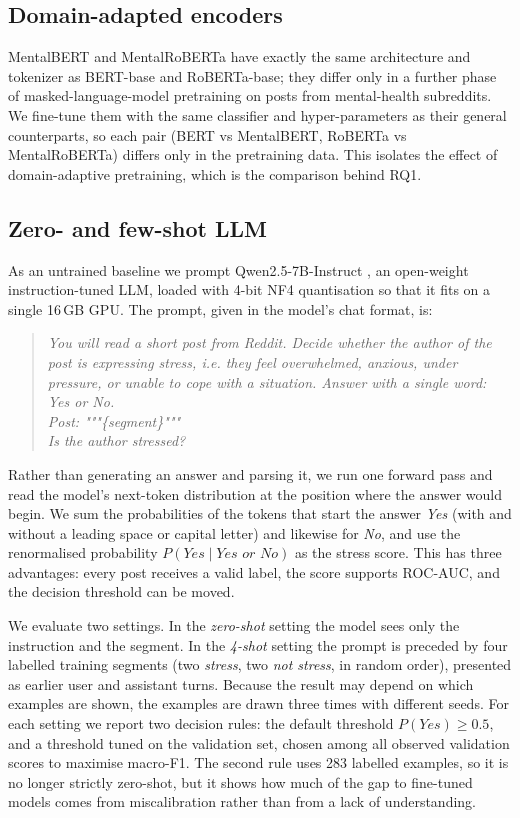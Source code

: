\subsection{Domain-adapted encoders}
MentalBERT and MentalRoBERTa \cite{ji2022mentalbert} have exactly the same architecture and tokenizer
as BERT-base and RoBERTa-base; they differ only in a further phase of masked-language-model
pretraining on posts from mental-health subreddits. We fine-tune them with the same classifier and
hyper-parameters as their general counterparts, so each pair (BERT vs MentalBERT, RoBERTa vs
MentalRoBERTa) differs only in the pretraining data. This isolates the effect of domain-adaptive
pretraining, which is the comparison behind RQ1.

\subsection{Zero- and few-shot LLM}
As an untrained baseline we prompt Qwen2.5-7B-Instruct \cite{qwen2024qwen25}, an open-weight
instruction-tuned LLM, loaded with 4-bit NF4 quantisation \cite{dettmers2023qlora} so that it fits on
a single 16\,GB GPU. The prompt, given in the model's chat format, is:

\begin{quote}\small
\textit{You will read a short post from Reddit. Decide whether the author of the post is expressing
stress, i.e. they feel overwhelmed, anxious, under pressure, or unable to cope with a situation.
Answer with a single word: Yes or No.\\[2pt]
Post: """\{segment\}"""\\[2pt]
Is the author stressed?}
\end{quote}

\noindent Rather than generating an answer and parsing it, we run one forward pass and read the
model's next-token distribution at the position where the answer would begin. We sum the
probabilities of the tokens that start the answer \emph{Yes} (with and without a leading space or
capital letter) and likewise for \emph{No}, and use the renormalised probability
$P(\textit{Yes} \mid \textit{Yes or No})$ as the stress score. This has three advantages: every post
receives a valid label, the score supports ROC-AUC, and the decision threshold can be moved.

We evaluate two settings. In the \emph{zero-shot} setting the model sees only the instruction and
the segment. In the \emph{4-shot} setting the prompt is preceded by four labelled training segments
(two \emph{stress}, two \emph{not stress}, in random order), presented as earlier user and assistant
turns. Because the result may depend on which examples are shown, the examples are drawn three times
with different seeds. For each setting we report two decision rules: the default threshold
$P(\textit{Yes}) \ge 0.5$, and a threshold tuned on the validation set, chosen among all observed
validation scores to maximise macro-F1. The second rule uses 283 labelled examples, so it
is no longer strictly zero-shot, but it shows how much of the gap to fine-tuned models comes from
miscalibration rather than from a lack of understanding.

